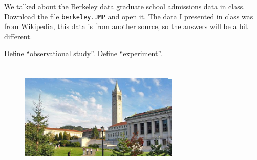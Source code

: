 \documentclass[12pt]{article}
\begin{document}
\problem We talked about the Berkeley data graduate school admissions data in class. Download the file \texttt{berkeley.JMP} and open it. The data I presented in class was from \href{http://en.wikipedia.org/wiki/Simpson%27s_paradox#Berkeley_gender_bias_case}{Wikipedia}, this data is from another source, so the answers will be a bit different.

\benum

\easysubproblem Define ``observational study''.
\easysubproblem Define ``experiment''.

\begin{figure}[htp]
\centering
\includegraphics[width=3in,height=2.11in]{berkeley.jpg}
\end{figure}
\FloatBarrier
\end{document}
